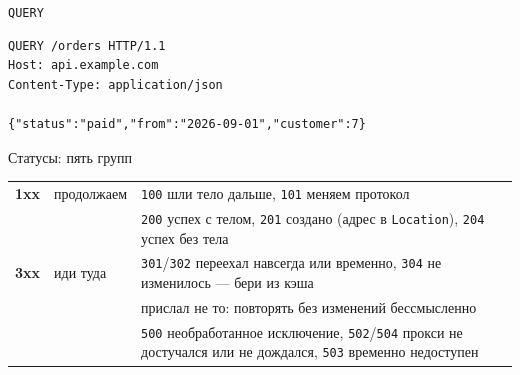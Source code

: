 \documentclass[aspectratio=169,10pt,t]{beamer}
\newcommand{\rawfont}{\ttfamily\fontsize{8.4}{10.6}\selectfont}
\begin{document}
\begin{frame}[plain]
\end{frame}

\begin{frame}[fragile]{\texttt{QUERY}}
  \slidetop

\begin{lstlisting}[style=plain,basicstyle=\rawfont]
QUERY /orders HTTP/1.1
Host: api.example.com
Content-Type: application/json

{"status":"paid","from":"2026-09-01","customer":7}
\end{lstlisting}

  \slidegap
\end{frame}

\begin{frame}{Статусы: пять групп}
  \slidetop
  {\renewcommand{\arraystretch}{1.5}\small
  \begin{tabular}{@{}L{1.0cm}L{2.3cm}L{9.5cm}@{}}
    \textbf{1xx} & продолжаем     & \texttt{100} шли тело дальше,
      \texttt{101} меняем протокол \\
     &  & \texttt{200} успех с телом,
      \texttt{201} создано (адрес в \texttt{Location}), \texttt{204} успех без тела \\
    \textbf{3xx} & иди туда        & \texttt{301}/\texttt{302} переехал навсегда
      или временно, \texttt{304} не изменилось --- бери из кэша \\
     &  & прислал не то: повторять без изменений
      бессмысленно \\
     &   & \texttt{500} необработанное исключение,
      \texttt{502}/\texttt{504} прокси не достучался или не дождался,
      \texttt{503} временно недоступен \\
  \end{tabular}}

  \slidegap
\end{frame}
\end{document}
